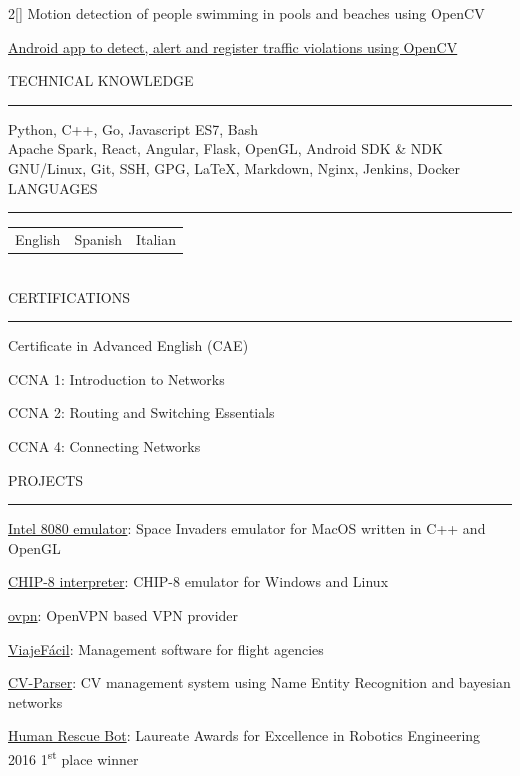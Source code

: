 \documentclass[a4paper, 12pt]{article}
\newenvironment{myparacol}[2][]{%
\begin{paracol}{#2}[#1]\setlength{\parindent}{0pt}}{%
\end{paracol}}
\begin{document}
\begin{sloppypar}
\begin{myparacol}{2}
    Motion detection of people swimming in pools and beaches using OpenCV

    \href{https://github.com/hugo19941994/infrac-coche}{Android app to detect, alert and register traffic violations using OpenCV}
    \\

    \switchcolumn{}

    TECHNICAL KNOWLEDGE
    \vspace{1mm}
    \hrule
    \kern9pt

    Python, C++, Go, Javascript ES7, Bash\\

    Apache Spark, React, Angular, Flask, OpenGL, Android SDK \& NDK\\

    GNU/Linux, Git, SSH, GPG, \LaTeX, Markdown, Nginx, Jenkins, Docker\\

    LANGUAGES
    \vspace{1mm}
    \hrule
    \kern9pt
    \noindent\begin{tabularx}{\columnwidth}{@{} X X X}
        English & Spanish & Italian
    \end{tabularx}
    \\

    CERTIFICATIONS
    \vspace{1mm}
    \hrule
    \kern9pt
    Certificate in Advanced English (CAE)

    CCNA 1: Introduction to Networks

    CCNA 2: Routing and Switching Essentials

    CCNA 4: Connecting Networks

    \switchcolumn{}

    \noindent PROJECTS
    \vspace{1mm}
    \hrule
    \kern9pt
    \href{https://github.com/hugo19941994/SpaceInvaders-Emu}{Intel 8080 emulator}: Space Invaders emulator for MacOS written in C++ and OpenGL

    \href{https://github.com/hugo19941994/CHIP8-Emu}{CHIP-8 interpreter}: CHIP-8 emulator for Windows and Linux

    \href{https://vpn.hugofs.com}{ovpn}: OpenVPN based VPN provider

    \href{https://github.com/hugo19941994/ViajeFacil}{ViajeFácil}: Management software for flight agencies

    \href{https://github.com/hugo19941994/CV-Parser}{CV-Parser}: CV management system using Name Entity Recognition and bayesian networks

    \href{https://github.com/hugo19941994/robot}{Human Rescue Bot}: Laureate Awards for Excellence in Robotics Engineering 2016 1\textsuperscript{st} place winner

\end{myparacol}
\end{sloppypar}
\end{document}
